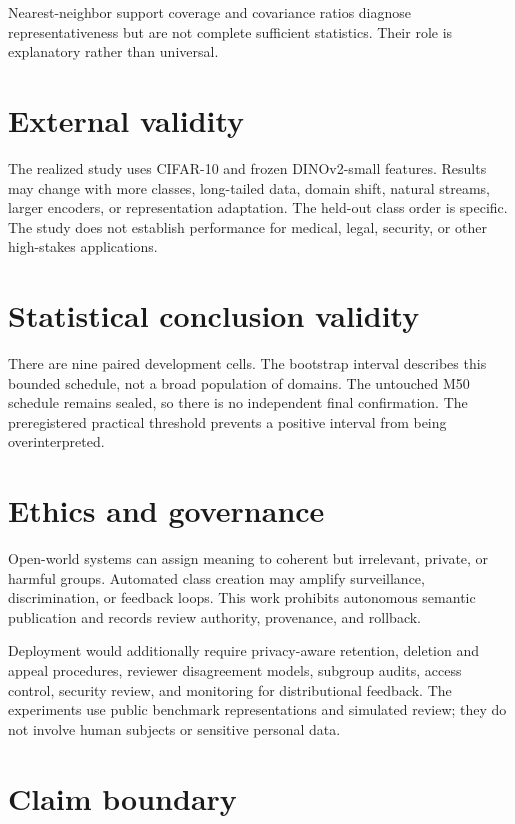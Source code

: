 \documentclass[12pt,oneside]{report}
\begin{document}
Nearest-neighbor support coverage and covariance ratios diagnose
representativeness but are not complete sufficient statistics. Their role is
explanatory rather than universal.

\section{External validity}

The realized study uses CIFAR-10 and frozen DINOv2-small features. Results may
change with more classes, long-tailed data, domain shift, natural streams,
larger encoders, or representation adaptation. The held-out class order is
specific. The study does not establish performance for medical, legal,
security, or other high-stakes applications.

\section{Statistical conclusion validity}

There are nine paired development cells. The bootstrap interval describes this
bounded schedule, not a broad population of domains. The untouched M50 schedule
remains sealed, so there is no independent final confirmation. The
preregistered practical threshold prevents a positive interval from being
overinterpreted.

\section{Ethics and governance}

Open-world systems can assign meaning to coherent but irrelevant, private, or
harmful groups. Automated class creation may amplify surveillance,
discrimination, or feedback loops. This work prohibits autonomous semantic
publication and records review authority, provenance, and rollback.

Deployment would additionally require privacy-aware retention, deletion and
appeal procedures, reviewer disagreement models, subgroup audits, access
control, security review, and monitoring for distributional feedback. The
experiments use public benchmark representations and simulated review; they do
not involve human subjects or sensitive personal data.

\section{Claim boundary}
\end{document}

